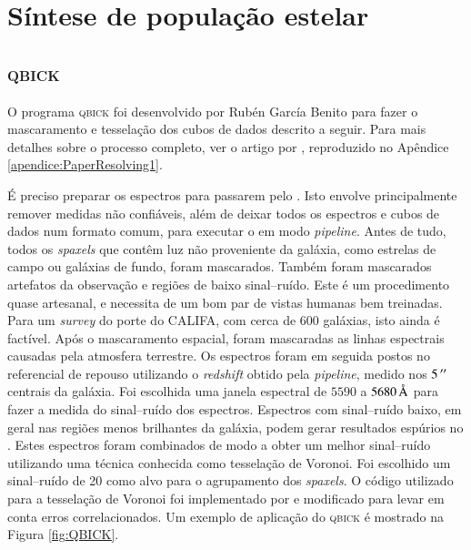 \section{Síntese de população estelar}
\label{sec:ifs:sintese}


\subsection{\textsc{qbick}}
\label{sec:ifs:qbick}

O programa \textsc{qbick} foi desenvolvido por Rubén García Benito para fazer o
mascaramento e tesselação dos cubos de dados descrito a seguir. Para mais
detalhes sobre o processo completo, ver o artigo por \citet{CidFernandes2013},
reproduzido no Apêndice \ref{apendice:PaperResolving1}.

É preciso preparar os espectros para passarem pelo \starlight. Isto envolve
principalmente remover medidas não confiáveis, além de deixar todos os espectros
e cubos de dados num formato comum, para executar o \starlight em modo {\em
pipeline}. Antes de tudo, todos os {\em spaxels} que contêm luz não proveniente
da galáxia, como estrelas de campo ou galáxias de fundo, foram mascarados.
Também foram mascarados artefatos da observação e regiões de baixo sinal--ruído.
Este é um procedimento quase artesanal, e necessita de um bom par de vistas
humanas bem treinadas. Para um {\em survey} do porte do CALIFA, com cerca de 600
galáxias, isto ainda é factível. Após o mascaramento espacial, foram mascaradas
as linhas espectrais causadas pela atmosfera terrestre. Os espectros foram em
seguida postos no referencial de repouso utilizando o {\em redshift} obtido pela
{\em pipeline}, medido nos $5\,^{\prime\prime}$ centrais da galáxia. Foi escolhida uma
janela espectral de $5590$ a $5680\,\text{\normalfont\AA}$ para fazer a medida do
sinal--ruído dos espectros. Espectros com sinal--ruído baixo, em geral nas
regiões menos brilhantes da galáxia, podem gerar resultados espúrios no
\starlight. Estes espectros foram combinados de modo a obter um melhor
sinal--ruído utilizando uma técnica conhecida como tesselação de Voronoi. Foi
escolhido um sinal--ruído de 20 como alvo para o agrupamento dos {\em spaxels}.
O código utilizado para a tesselação de Voronoi foi implementado por
\citet{Cappellari2003} e modificado para levar em conta erros correlacionados.
Um exemplo de aplicação do \textsc{qbick} é mostrado na Figura \ref{fig:QBICK}.

